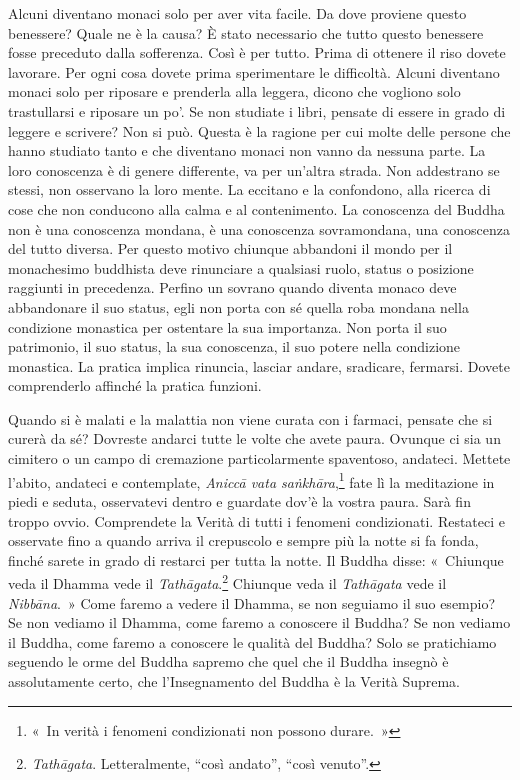 Alcuni diventano monaci solo per aver vita facile. Da dove proviene
questo benessere? Quale ne è la causa? È stato necessario che tutto
questo benessere fosse preceduto dalla sofferenza. Così è per tutto.
Prima di ottenere il riso dovete lavorare. Per ogni cosa dovete prima
sperimentare le difficoltà. Alcuni diventano monaci solo per riposare e
prenderla alla leggera, dicono che vogliono solo trastullarsi e riposare
un po'. Se non studiate i libri, pensate di essere in grado di leggere e
scrivere? Non si può. Questa è la ragione per cui molte delle persone
che hanno studiato tanto e che diventano monaci non vanno da nessuna
parte. La loro conoscenza è di genere differente, va per un'altra
strada. Non addestrano se stessi, non osservano la loro mente. La
eccitano e la confondono, alla ricerca di cose che non conducono alla
calma e al contenimento. La conoscenza del Buddha non è una conoscenza
mondana, è una conoscenza sovramondana, una conoscenza del tutto
diversa. Per questo motivo chiunque abbandoni il mondo per il
monachesimo buddhista deve rinunciare a qualsiasi ruolo, status o
posizione raggiunti in precedenza. Perfino un sovrano quando diventa
monaco deve abbandonare il suo status, egli non porta con sé quella roba
mondana nella condizione monastica per ostentare la sua importanza. Non
porta il suo patrimonio, il suo status, la sua conoscenza, il suo potere
nella condizione monastica. La pratica implica rinuncia, lasciar andare,
sradicare, fermarsi. Dovete comprenderlo affinché la pratica funzioni.

Quando si è malati e la malattia non viene curata con i farmaci, pensate
che si curerà da sé? Dovreste andarci tutte le volte che avete paura.
Ovunque ci sia un cimitero o un campo di cremazione particolarmente
spaventoso, andateci. Mettete l'abito, andateci e contemplate,
\emph{Aniccā vata saṅkhāra},\footnote{«~In verità i fenomeni
  condizionati non possono durare.~»} fate lì la meditazione in piedi e
seduta, osservatevi dentro e guardate dov'è la vostra paura. Sarà fin
troppo ovvio. Comprendete la Verità di tutti i fenomeni condizionati.
Restateci e osservate fino a quando arriva il crepuscolo e sempre più la
notte si fa fonda, finché sarete in grado di restarci per tutta la
notte. Il Buddha disse: «~Chiunque veda il Dhamma vede il
\emph{Tathāgata}.\footnote{\emph{Tathāgata}. Letteralmente, ``così
  andato'', ``così venuto''.} Chiunque veda il \emph{Tathāgata} vede il
\emph{Nibbāna}.~» Come faremo a vedere il Dhamma, se non seguiamo il suo
esempio? Se non vediamo il Dhamma, come faremo a conoscere il Buddha? Se
non vediamo il Buddha, come faremo a conoscere le qualità del Buddha?
Solo se pratichiamo seguendo le orme del Buddha sapremo che quel che il
Buddha insegnò è assolutamente certo, che l'Insegnamento del Buddha è la
Verità Suprema.

